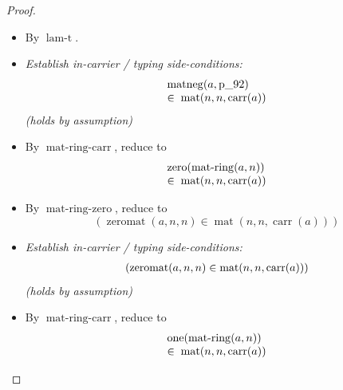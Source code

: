 \documentclass[11pt]{article}
\theoremstyle{plain}
\begin{document}
\begin{proof}
\begin{itemize}[leftmargin=2.8em, itemsep=4pt, parsep=1pt]
  \item[\textbf{35}] By $\operatorname{lam\text{-}t}$.
  \item[\textbf{36--38}] \emph{Establish in-carrier / typing side-conditions:}
\begin{equation*}
\begin{array}{@{}l@{}}
\begin{array}{@{}l@{}} \operatorname{matneg}(a, \operatorname{p\_92}) \\ \in\; \operatorname{mat}(n, n, \operatorname{carr}(a)) \end{array}
\end{array}
\end{equation*}
  \emph{(holds by assumption)}
  \item[\textbf{39}] By $\operatorname{mat\text{-}ring\text{-}carr}$, reduce to
\begin{equation*}
\begin{array}{@{}l@{}} \operatorname{zero}(\operatorname{mat\text{-}ring}(a, n)) \\ \in\; \operatorname{mat}(n, n, \operatorname{carr}(a)) \end{array}
\end{equation*}

  \item[\textbf{40}] By $\operatorname{mat\text{-}ring\text{-}zero}$, reduce to
\begin{equation*}
(\operatorname{zeromat}(a, n, n) \in \operatorname{mat}(n, n, \operatorname{carr}(a)))
\end{equation*}

  \item[\textbf{41--42}] \emph{Establish in-carrier / typing side-conditions:}
\begin{equation*}
\begin{array}{@{}l@{}}
(\operatorname{zeromat}(a, n, n) \in \operatorname{mat}(n, n, \operatorname{carr}(a)))
\end{array}
\end{equation*}
  \emph{(holds by assumption)}
  \item[\textbf{43}] By $\operatorname{mat\text{-}ring\text{-}carr}$, reduce to
\begin{equation*}
\begin{array}{@{}l@{}} \operatorname{one}(\operatorname{mat\text{-}ring}(a, n)) \\ \in\; \operatorname{mat}(n, n, \operatorname{carr}(a)) \end{array}
\end{equation*}


\end{itemize}
\end{proof}
\end{document}
